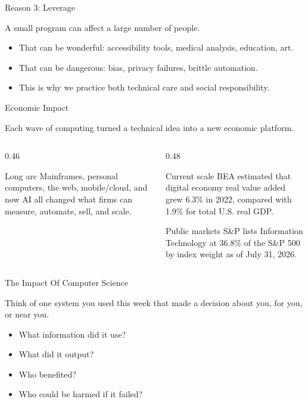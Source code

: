 \documentclass[aspectratio=169]{beamer}
\begin{document}
\begin{frame}{Reason 3: Leverage}
  \begin{keyidea}
    A small program can affect a large number of people.
  \end{keyidea}
  \begin{itemize}
    \item That can be wonderful: accessibility tools, medical analysis, education, art.
    \item That can be dangerous: bias, privacy failures, brittle automation.
    \item This is why we practice both technical care and social responsibility.
  \end{itemize}
\end{frame}

\begin{frame}[shrink=4]{Economic Impact}
  \begin{keyidea}
    Each wave of computing turned a technical idea into a new economic platform.
  \end{keyidea}
  \begin{columns}[T,onlytextwidth]
    \begin{column}{0.46\textwidth}
      \begin{block}{Long arc}
        Mainframes, personal computers, the web, mobile/cloud, and now AI all changed what firms can measure, automate, sell, and scale.
      \end{block}
    \end{column}
    \begin{column}{0.48\textwidth}
      \begin{block}{Current scale}
        BEA estimated that digital economy real value added grew 6.3\% in 2022, compared with 1.9\% for total U.S. real GDP.
      \end{block}
      \begin{block}{Public markets}
        S\&P lists Information Technology at 36.8\% of the S\&P 500 by index weight as of July 31, 2026.
      \end{block}
    \end{column}
  \end{columns}
\end{frame}

\begin{frame}{The Impact Of Computer Science}
  \begin{activity}
    Think of one system you used this week that made a decision about you, for you, or near you.
  \end{activity}
  \vspace{0.12in}
  \begin{itemize}
    \item What information did it use?
    \item What did it output?
    \item Who benefited?
    \item Who could be harmed if it failed?
  \end{itemize}
\end{frame}
\end{document}
